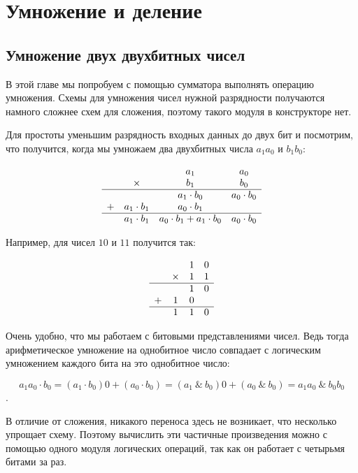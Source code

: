\chapter{Умножение и деление}

\section{Умножение двух двухбитных чисел}

В этой главе мы попробуем с помощью сумматора
выполнять операцию умножения.
Схемы для умножения чисел нужной разрядности получаются намного сложнее схем для сложения,
поэтому такого модуля в конструкторе нет.

Для простоты уменьшим разрядность входных данных до двух бит и
посмотрим, что получится, когда мы умножаем два двухбитных числа
$a_1a_0$ и $b_1b_0$:

$$
\begin{array}{cccc}
     &  & a_1 & a_0 \\
& \times  & b_1 & b_0 \\ \hline
  & & a_1 \cdot b_0 & a_0 \cdot b_0 \\
+ & a_1 \cdot b_1 & a_0 \cdot b_1 & \\ \hline
& a_1 \cdot b_1 & a_0 \cdot b_1 + a_1 \cdot b_0 & a_0 \cdot b_0 \\
\end{array}
$$

Например, для чисел $10$ и $11$ получится так:

$$
\begin{array}{cccc}
     &  & 1 & 0 \\
& \times  & 1 & 1 \\ \hline
  & & 1 & 0 \\
+ & 1 & 0 & \\ \hline
& 1 & 1 & 0 \\
\end{array}
$$

Очень удобно, что мы работаем с битовыми представлениями чисел.
Ведь тогда арифметическое умножение на однобитное число совпадает
с логическим умножением каждого бита на это однобитное число:

$$a_1a_0 \cdot b_0 = (a_1\cdot b_0)0 + (a_0 \cdot b_0) = (a_1\ \mbox{\&}\ b_0)0 + (a_0\ \mbox{\&}\ b_0) = a_1a_0\ \mbox{\&}\ b_0b_0$$.

В отличие от сложения,
никакого переноса здесь не возникает, что несколько упрощает схему.
Поэтому вычислить эти частичные произведения можно с помощью одного модуля
логических операций, так как он работает с четырьмя битами за раз.

